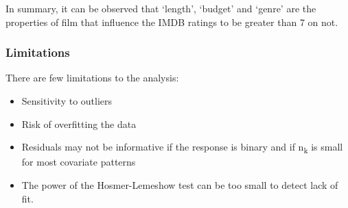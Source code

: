 \documentclass[
  letterpaper,
  DIV=11,
  numbers=noendperiod]{scrartcl}
\begin{document}
In summary, it can be observed that `length', `budget' and `genre' are
the properties of film that influence the IMDB ratings to be greater
than 7 on not.

\hypertarget{limitations}{%
\subsubsection{Limitations}\label{limitations}}

There are few limitations to the analysis:

\begin{itemize}
\item
  Sensitivity to outliers
\item
  Risk of overfitting the data
\item
  Residuals may not be informative if the response is binary and if
  n\textsubscript{k} is small for most covariate patterns
\item
  The power of the Hosmer-Lemeshow test can be too small to detect lack
  of fit.
\end{itemize}
\end{document}
